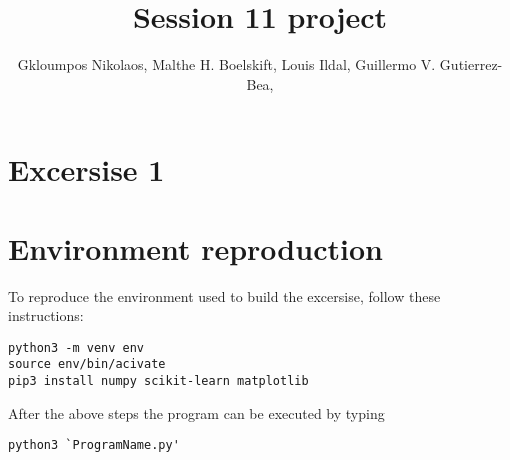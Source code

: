 \documentclass{article}
\title{Session 11 project}
\author {
      Gkloumpos Nikolaos,
      Malthe H. Boelskift,
      Louis Ildal,
      Guillermo V. Gutierrez-Bea,
}
\begin{document}
\maketitle


\section{Excersise 1}



\section {Environment reproduction}
To reproduce the environment used to build the excersise, follow these instructions:

\begin{verbatim}
python3 -m venv env
source env/bin/acivate
pip3 install numpy scikit-learn matplotlib
\end{verbatim}

After the above steps the program can be executed by typing

\begin{verbatim}
python3 `ProgramName.py'
\end{verbatim}



\end{document}
